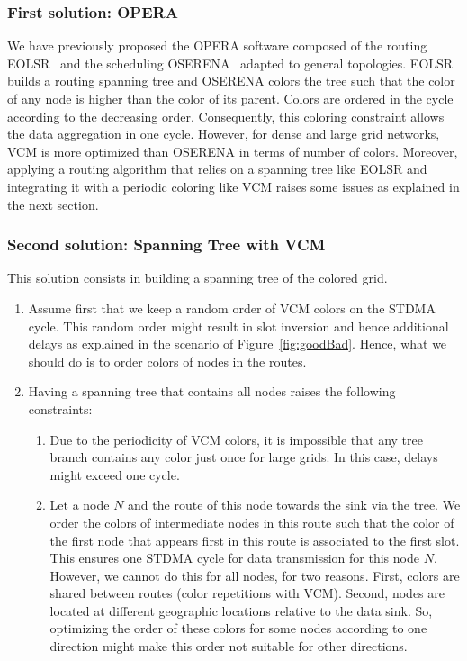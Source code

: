 \subsubsection{First solution: OPERA~\cite{operaSite}}
We have previously proposed the OPERA software composed of the routing EOLSR~\cite{operaSite} and the scheduling OSERENA~\cite{oserena} adapted to general topologies. EOLSR builds a routing spanning tree and OSERENA colors the tree such that the color of any node is higher than the color of its parent. Colors are ordered in the cycle according to the decreasing order. Consequently, this coloring constraint allows the data aggregation in one cycle. However, for dense and large grid networks, VCM is more optimized than OSERENA in terms of number of colors. 
Moreover, applying a routing algorithm that relies on a spanning tree like EOLSR and integrating it with a periodic coloring like VCM raises some issues as explained in the next section.

\subsubsection{Second solution: Spanning Tree with VCM}
This solution consists in building a spanning tree of the colored grid.
\begin{enumerate}
\item Assume first that we keep a random order of VCM colors on the STDMA cycle. This random order might result in slot inversion and hence additional delays as explained in the scenario of Figure~\ref{fig:goodBad}. Hence, what we should do is to order colors of nodes in the routes.
\item Having a spanning tree that contains all nodes raises the following constraints:
\begin{enumerate}
\item Due to the periodicity of VCM colors, it is impossible that any tree branch contains any color just once for large grids. In this case, delays might exceed one cycle.
\item Let a node $N$ and the route of this node towards the sink via the tree. We order the colors of intermediate nodes in this route such that the color of the first node that appears first in this route is associated to the first slot.
This ensures one STDMA cycle for data transmission for this node $N$. However, we cannot do this for all nodes, for two reasons. First, colors are shared between routes (color repetitions with VCM). Second, nodes are located at different geographic locations relative to the data sink. So, optimizing the order of these colors for some nodes according to one direction might make this order not suitable for other directions. 
\end{enumerate}
\end{enumerate}
 
